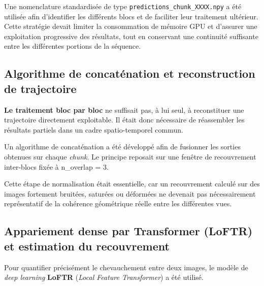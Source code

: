 \documentclass[12pt,a4paper,oneside]{report}
\newcommand{\textsb}[1]{{\fontseries{sb}\selectfont #1}}
\begin{document}
\hspace*{1cm}Une nomenclature standardisée de type \texttt{predictions\_chunk\_XXXX.npy} a été utilisée afin d'identifier les différents blocs et de faciliter leur traitement ultérieur.\\
Cette stratégie devait limiter la consommation de mémoire GPU et d'assurer une exploitation progressive des résultats, tout en conservant une continuité suffisante entre les différentes portions de la séquence.

\clearpage

\subsection{Algorithme de concaténation et reconstruction de trajectoire}

\vspace{0.5cm}

\hspace*{1cm}\textbf{Le traitement bloc par bloc} ne suffisait pas, à lui seul, à reconstituer une trajectoire directement exploitable. Il était donc nécessaire de réassembler les résultats partiels dans un cadre spatio-temporel commun.\vspace{0.2cm}

\hspace*{1cm}Un algorithme de concaténation a été développé afin de fusionner les sorties obtenues sur chaque \textit{chunk}. Le principe reposait sur une fenêtre de recouvrement inter-blocs fixée à \textsb{n\_overlap = 3}.\vspace{0.1cm}

\textsb{\hspace*{1cm}Cette étape de normalisation était essentielle, car un recouvrement calculé sur des images fortement bruitées, saturées ou déformées ne devenait pas nécessairement représentatif de la cohérence géométrique réelle entre les différentes vues.}

\subsection{Appariement dense par Transformer (LoFTR) et estimation du recouvrement}

\vspace{0.5cm}

\hspace*{1cm}Pour quantifier précisément le chevauchement entre deux images, le modèle de \textsb{\textit{deep learning}} \textbf{LoFTR} (\textsb{\textit{Local Feature Transformer}}) a été utilisé. \vspace{0.05cm}
\end{document}

